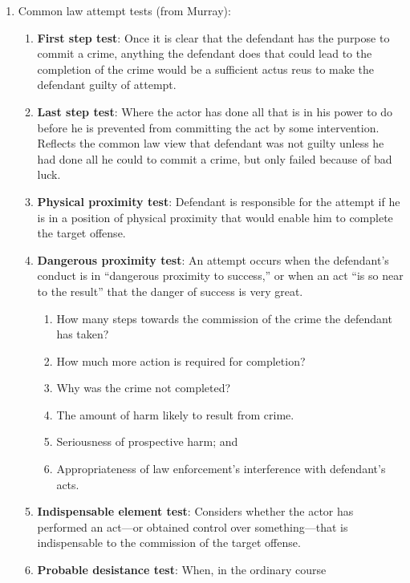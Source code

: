 \begin{enumerate}
\begin{itemize}
    \end{itemize}
    \item Common law attempt tests (from Murray):
    \begin{enumerate}
        \item \textbf{First step test}: Once it is clear that the defendant 
        has the purpose to commit a crime, anything the defendant does that 
        could lead to the completion of the crime would be a sufficient actus 
        reus to make the defendant guilty of attempt.
        \item \textbf{Last step test}: Where the actor has done all that is in 
        his power to do before he is prevented from committing the act by some 
        intervention. Reflects the common law view that defendant was not 
        guilty unless he had done all he could to commit a crime, but only 
        failed because of bad luck.
        \item \textbf{Physical proximity test}: Defendant is responsible for 
        the attempt if he is in a position of physical proximity that would 
        enable him to complete the target offense.
        \item \textbf{Dangerous proximity test}: An attempt occurs when the 
        defendant's conduct is in ``dangerous proximity to success,'' or when 
        an act ``is so near to the result'' that the danger of success is very 
        great.
        \begin{enumerate}
            \item How many steps towards the commission of the crime the 
            defendant has taken?
            \item How much more action is required for completion?
            \item Why was the crime not completed?
            \item The amount of harm likely to result from crime.
            \item Seriousness of prospective harm; and 
            \item Appropriateness of law enforcement's interference with defendant's acts.
        \end{enumerate}
        \item \textbf{Indispensable element test}: Considers whether the actor 
        has performed an act---or obtained control over something---that is 
        indispensable to the commission of the target offense. 
        \item \textbf{Probable desistance test}: When, in the ordinary course 

\end{enumerate}
\end{enumerate}
